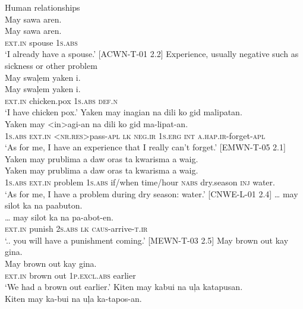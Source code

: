 \ea
\label{ex:humanrelationships}
Human relationships \\
May  sawa  aren. \\\smallskip \gll May  sawa  aren. \\
\textsc{ext.in}  spouse  1\textsc{s.abs}  \\
\glt ‘I already have  a spouse.’ [ACWN-T-01 2.2]
\z
\ea
\label{ex:experiences-1}
Experience, usually negative such as sickness or other problem \\
May  swaļem  yaken  i. \\\smallskip \gll May  swaļem  yaken  i. \\
\textsc{ext.in}  chicken.pox  1\textsc{s.abs}  \textsc{def.n} \\
\glt‘I have chicken pox.’    
\z
\ea
Yaken  may  inagian  na  dili  ko  gid  malipatan. \\\smallskip \gll Yaken  may  <in>agi-an  na  dili  ko  gid  ma-lipat-an. \\
1\textsc{s.abs}  \textsc{ext.in} <\textsc{nr.res}>pass-\textsc{apl}  \textsc{lk}  \textsc{neg.ir}  1\textsc{s.erg}  \textsc{int}  \textsc{a.hap.ir}-forget-\textsc{apl} \\
\glt `As for me, I have an experience that I really can’t forget.’  [EMWN-T-05 2.1]
\z
\ea
Yaken  may  prublima  a  daw  oras  ta  kwarisma  a  waig. \\\smallskip \gll Yaken  may  prublima  a  daw  oras  ta  kwarisma  a  waig. \\
1\textsc{s.abs}  \textsc{ext.in}  problem  1\textsc{s.abs}  if/when  time/hour  \textsc{nabs} dry.season  \textsc{inj}  water. \\
\glt ‘As for me, I have a problem during dry season: water.’ [CNWE-L-01 2.4]
\z
\ea
… may  silot  ka  na  paabuton. \\\smallskip \gll … may  silot  ka  na  pa-abot-en. \\
{} \textsc{ext.in}  punish  2\textsc{s.abs}  \textsc{lk}  \textsc{caus}-arrive-\textsc{t.ir} \\
\glt ‘.. you will have a punishment coming.’ [MEWN-T-03 2.5]
\z
\ea
May  brown out  kay  gina.   \\\smallskip \gll May  brown out  kay  gina.   \\
\textsc{ext.in}  brown out  1\textsc{p.excl.abs}  earlier \\
\glt ‘We had a brown out earlier.’
\z
\ea
\label{ex:experiences-2}
Kiten  may  kabui  na  uļa  katapusan. \\\smallskip \gll Kiten  may  ka-bui  na  uļa  ka-tapos-an. \\

